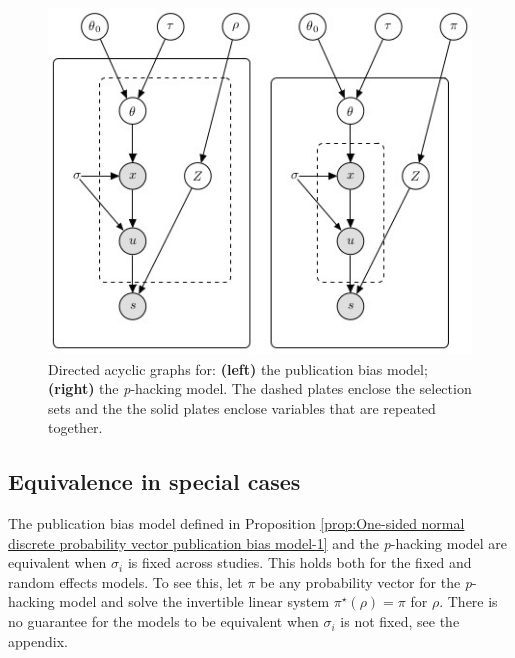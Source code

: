 \documentclass[useAMS,usenatbib,referee]{biom}
\begin{document}
\begin{figure}
\begin{center}
\includegraphics{plots/figure_B.jpg}
\end{center}
\caption{\label{fig:Plate notation, publication bias and p-hacking} Directed acyclic graphs for: {\bf (left)}
the publication bias model; {\bf (right)} the \textit{p}-hacking model. The dashed plates enclose the selection sets and the the solid plates enclose variables that are repeated together.}
\end{figure}

\subsection{Equivalence in special cases}
The publication bias model defined in Proposition \ref{prop:One-sided normal discrete probability vector publication bias model-1} and the \textit{p}-hacking model are equivalent when $\sigma_{i}$ is fixed across studies. This holds both for the fixed and random effects models. To see this, let $\pi$ be any probability vector for the \textit{p}-hacking model and solve the invertible linear system $\pi^{\star}(\rho)=\pi$ for $\rho$. There is no guarantee for the models to be equivalent when $\sigma_{i}$ is not fixed, see the appendix.
\end{document}

